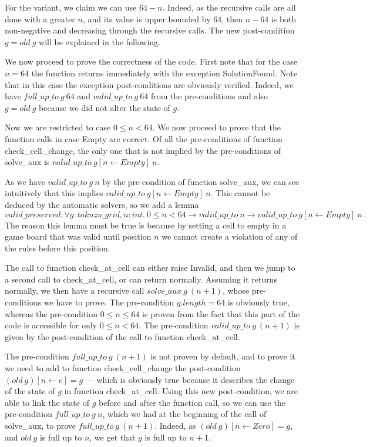 \documentclass[]{StandardTemplate}
\begin{document}
For the variant, we claim we can use $ 64 - n $. Indeed, as the recursive calls are all done with a greater $ n $, and its value is upper bounded by $ 64 $, then $ n - 64 $ is both non-negative and decreasing through the recursive calls. The new post-condition $ g= old~g $ will be explained in the following.

We now proceed to prove the correctness of the code. First note that for the case $ n=64 $ the function returns immediately with the exception SolutionFound. Note that in this case the exception post-conditions are obviously verified. Indeed, we have $ full\_up\_to~g~64 $ and $ valid\_up\_to~g~64 $ from the pre-conditions and also $ g = old~g $ because we did not alter the state of $ g $.

Now we are restricted to case $ 0 \leq n < 64 $. We now proceed to prove that the function calls in case Empty are correct. Of all the pre-conditions of function check\_cell\_change, the only one that is not implied by the pre-conditions of solve\_aux is $ valid\_up\_to~g[n \leftarrow Empty]~n $.

As we have $  valid\_up\_to~g~n $ by the pre-condition of function solve\_aux, we can see intuitively that this implies $ valid\_up\_to~g[n \leftarrow Empty]~n $. This cannot be deduced by the automatic solvers, so we add a lemma \[
valid\_preserved : \forall g : takuzu\_grid, n : int.~0 \leq n < 64 \to valid\_up\_to~n \to valid\_up\_to~g[n \leftarrow Empty]~n
\,.\] The reason this lemma must be true is because by setting a cell to empty in a game board that was valid until position $ n $ we cannot create a violation of any of the rules before this position.

The call to function check\_at\_cell can either raise Invalid, and then we jump to a second call to check\_at\_cell, or can return normally. Assuming it returns normally, we then have a recursive call $solve\_aux~g~(n+1)$, whose pre-conditions we have to prove. The pre-condition $ g.length=64 $ is obviously true, whereas the pre-condition $ 0 \leq n \leq 64 $ is proven from the fact that this part of the code is accessible for only $ 0 \leq n < 64 $. The pre-condition $ valid\_up\_to~g~(n+1) $ is given by the post-condition of the call to function check\_at\_cell.

The pre-condition $ full\_up\_to~g~(n+1) $ is not proven by default, and to prove it we need to add to function check\_cell\_change the post-condition $ (old~g)[n\leftarrow e] = g $ --- which is obviously true because it describes the change of the state of $ g $ in function check\_at\_cell. Using this new post-condition, we are able to link the state of $ g $ before and after the function call, so we can use the pre-condition $ full\_up\_to~g~n $, which we had at the beginning of the call of solve\_aux, to prove $ full\_up\_to~g~(n+1)$. Indeed, as $ (old~g)[n \leftarrow Zero] = g $, and $ old~g $ is full up to $ n $, we get that $ g $ is full up to $ n + 1$. 
\end{document}
